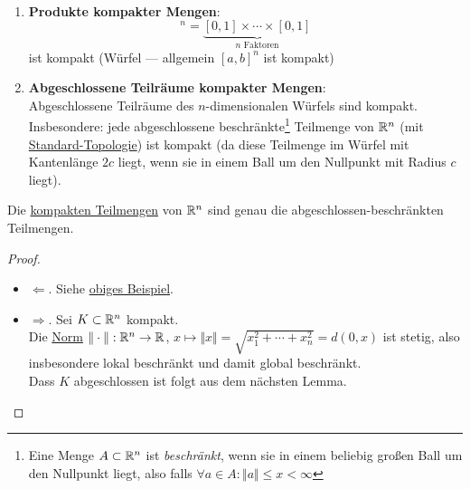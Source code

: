 \begin{example}
  \
  \begin{enumerate}
    \item \textbf{Produkte kompakter Mengen}:
      \begin{equation*}
        [0,1]^n = \underbrace{[0,1] \times \cdots \times [0,1]}_{n \text{ Faktoren}}
      \end{equation*}
      ist kompakt (Würfel --- allgemein $ [a,b]^n $ ist kompakt) 
    \item \textbf{Abgeschlossene Teilräume kompakter Mengen}\label{bsp:abgeschlosseneTRkompakterMengen}: \\
      Abgeschlossene Teilräume des $ n $-dimensionalen Würfels sind kompakt. Insbesondere: jede abgeschlossene beschränkte\footnote{Eine Menge $ A \subset \mathbb{R}^n $ ist \emph{beschränkt}, wenn sie in einem beliebig großen Ball um den Nullpunkt liegt, also falls $ \forall a \in A : \Vert a \Vert \leq x < \infty $} Teilmenge von $ \mathbb{R}^n $ (mit \hyperref[bsp:standardtopologie]{Standard-Topologie}) ist kompakt (da diese Teilmenge im Würfel mit Kantenlänge $ 2c $ liegt, wenn sie in einem Ball um den Nullpunkt mit Radius $ c $ liegt).
  \end{enumerate}
\end{example}

\begin{theorem}
  Die \hyperref[def:kompakt]{kompakten Teilmengen} von $ \mathbb{R}^n $ sind genau die abgeschlossen-beschränkten Teilmengen.
  \begin{proof}
    \
    \begin{itemize}
      \item $ \Leftarrow $. Siehe \hyperref[bsp:abgeschlosseneTRkompakterMengen]{obiges Beispiel}.
      \item $ \Rightarrow $. Sei $ K \subset \mathbb{R}^n $ kompakt. \\
        Die \hyperref[bsp:norm]{Norm} $ \Vert \cdot \Vert : \mathbb{R}^n \to \mathbb{R} $, $ x \mapsto \Vert x \Vert = \sqrt{x_1^2 + \cdots + x_n^2} = d(0,x) $ ist stetig, also insbesondere lokal beschränkt und damit global beschränkt. \\
        Dass $ K $ abgeschlossen ist folgt aus dem nächsten Lemma.
    \end{itemize}
  \end{proof}
\end{theorem}

